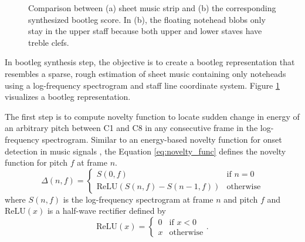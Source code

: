 \documentclass[letterpaper, 10pt, conference]{ieeeconf}  %
\begin{document}
\begin{figure}
    \centering
    \hspace*{-2cm}
    \hspace*{-2cm}
    \caption{Comparison between (a) sheet music strip and (b) the corresponding synthesized bootleg score. In (b), the floating notehead blobs only stay in the upper staff because both upper and lower staves have treble clefs.}
    \label{fig:bootleg}
\end{figure}

In bootleg synthesis step, the objective is to create a bootleg representation that resembles a sparse, rough estimation of sheet music containing only noteheads using a log-frequency spectrogram and staff line coordinate system. Figure \ref{fig:bootleg} visualizes a bootleg representation. 

The first step is to compute novelty function to locate sudden change in energy of an arbitrary pitch between C1 and C8 in any consecutive frame in the log-frequency spectrogram. Similar to an energy-based novelty function for onset detection in music signals \cite{onset}, the Equation \ref{eq:novelty_func} defines the novelty function for pitch $f$ at frame $n$.
\begin{equation}
    \Delta(n,f) = \begin{cases}
        S(0,f) & \text{if $n = 0$} \\
        \text{ReLU}(S(n,f) - S(n-1,f)) & \text{otherwise}
    \end{cases}
    \label{eq:novelty_func}
\end{equation}
where $S(n,f)$ is the log-frequency spectrogram at frame $n$ and pitch $f$ and $\text{ReLU}(x)$ is a half-wave rectifier defined by
\begin{equation}
    \text{ReLU}(x) = \begin{cases}
        0 & \text{if $x < 0$} \\
        x & \text{otherwise}
    \end{cases}.
    \label{eq:half_wave}
\end{equation}
\end{document}
